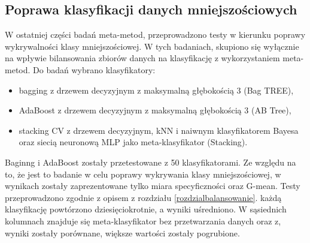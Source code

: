 \subsection{Poprawa klasyfikacji danych mniejszościowych}
W ostatniej części badań meta-metod, przeprowadzono testy w kierunku poprawy wykrywalności klasy mniejszościowej. W tych badaniach, skupiono się wyłącznie na wpływie bilansowania zbiorów danych na klasyfikację z wykorzystaniem meta-metod. Do badań wybrano klasyfikatory: 
\begin{itemize}
	\item bagging z drzewem decyzyjnym z maksymalną głębokością 3 (Bag TREE),
	\item AdaBoost z drzewem decyzyjnym z maksymalną głębokością 3 (AB Tree),
	\item stacking CV z drzewem decyzyjnym, kNN i naiwnym klasyfikatorem Bayesa oraz siecią neuronową MLP jako meta-klasyfikator (Stacking).
\end{itemize}
Baginng i AdaBoost zostały przetestowane z 50 klasyfikatorami. Ze względu na to, że jest to badanie w celu poprawy wykrywania klasy mniejszościowej, w wynikach zostały zaprezentowane tylko miara specyficzności oraz G-mean. Testy przeprowadzono zgodnie z opisem z rozdziału \ref{rozdzialbalansowanie}. każdą klasyfikację powtórzono dziesięciokrotnie, a wyniki uśredniono. W sąsiednich kolumnach znajduje się meta-klasyfikator bez przetwarzania danych oraz z, wyniki zostały porównane, większe wartości zostały pogrubione.
